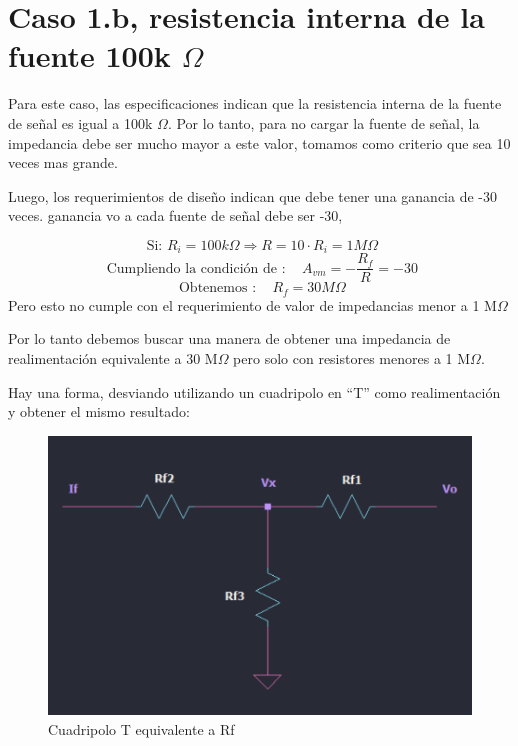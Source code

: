 \newpage
\section{Caso 1.b, resistencia interna de la fuente 100k \texorpdfstring{$\Omega$}{ohm}}

Para este caso, las especificaciones indican que la resistencia interna de la fuente de señal es igual a 100k $\Omega$. Por lo tanto, para no cargar la fuente de señal, la impedancia debe ser mucho mayor a este valor, tomamos como criterio que sea 10 veces mas grande.

Luego, los requerimientos de diseño indican que debe tener una ganancia de -30 veces. 
ganancia vo a cada fuente de señal debe ser -30, 

\[ \text { Si: } R_{i}=100k \Omega \Longrightarrow R=10 \cdot R_{i} = 1 M\Omega \]
\[ \text { Cumpliendo la condición de }: \quad A_{vm} =-\frac{R_{f}}{R}=-30 \]
\[ \text { Obtenemos }: \quad R_{f}=30 M\Omega \]
Pero esto no cumple con el requerimiento de valor de impedancias menor a 1 M$\Omega$
\vspace{1em}

Por lo tanto debemos buscar una manera de obtener una impedancia de realimentación equivalente a 30 M$\Omega$ pero solo con resistores menores a 1 M$\Omega$.

Hay una forma, desviando utilizando un cuadripolo en ``T'' como realimentación y obtener el mismo resultado:


\begin{figure}[h!]
    \centering
    \includegraphics[width=1\linewidth]{img/cuadripoloT.png}
    \caption{Cuadripolo T equivalente a Rf}
    \label{fig:cuadripoloT}
\end{figure}

